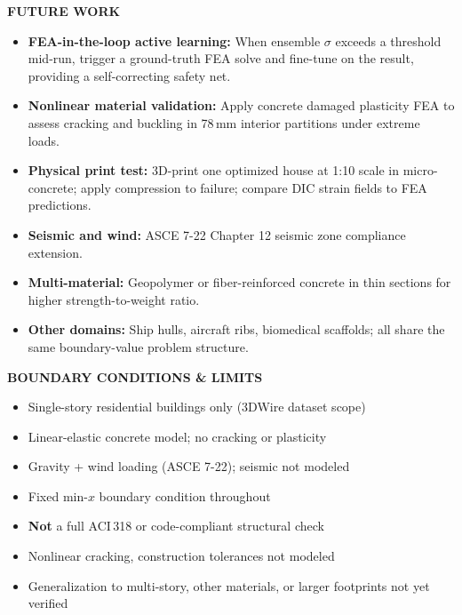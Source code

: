 \documentclass[10pt]{article}
\newenvironment{ccard}{%
  \begin{tcolorbox}[
    colback=cardfill, colframe=cardbdr,
    boxrule=0.5pt, arc=4pt, outer arc=4pt,
    left=3.5mm, right=3.5mm, top=2.5mm, bottom=2.5mm,
    width=\linewidth
  ]%
}{%
  \end{tcolorbox}%
}
\newcommand{\sechdr}[1]{%
  \begin{tcolorbox}[
    colback=secbar, colframe=secbar,
    boxrule=0pt, arc=3pt,
    left=4mm, right=4mm, top=1.5mm, bottom=1.5mm,
    width=\linewidth
  ]
    \centering\color{white}\fontsize{24pt}{26pt}\selectfont\bfseries
    \MakeUppercase{#1}
  \end{tcolorbox}%
  \vspace{1.5mm}%
}
\newlength{\RC}  \setlength{\RC} {29.72cm}
\newlength{\SG}  \setlength{\SG} {1.5mm}
\begin{document}
\begin{minipage}[t]{\RC}
\sechdr{Future Work}
\begin{ccard}
  \small\RaggedRight
  \begin{itemize}[leftmargin=1.2em, itemsep=3pt, topsep=0pt]
    \item \textbf{FEA-in-the-loop active learning:} When ensemble $\sigma$
      exceeds a threshold mid-run, trigger a ground-truth FEA solve and
      fine-tune on the result, providing a self-correcting safety net.
    \item \textbf{Nonlinear material validation:} Apply concrete damaged
      plasticity FEA to assess cracking and buckling in 78\,mm interior
      partitions under extreme loads.
    \item \textbf{Physical print test:} 3D-print one optimized house at
      1:10 scale in micro-concrete; apply compression to failure; compare
      DIC strain fields to FEA predictions.
    \item \textbf{Seismic and wind:} ASCE 7-22 Chapter 12 seismic zone
      compliance extension.
    \item \textbf{Multi-material:} Geopolymer or fiber-reinforced concrete
      in thin sections for higher strength-to-weight ratio.
    \item \textbf{Other domains:} Ship hulls, aircraft ribs, biomedical
      scaffolds; all share the same boundary-value problem structure.
  \end{itemize}
\end{ccard}
\vspace{\SG}

\sechdr{Boundary Conditions \& Limits}
\begin{ccard}
  \small\RaggedRight
  \begin{itemize}[leftmargin=1.2em, itemsep=3pt, topsep=0pt]
    \item Single-story residential buildings only (3DWire dataset scope)
    \item Linear-elastic concrete model; no cracking or plasticity
    \item Gravity + wind loading (ASCE 7-22); seismic not modeled
    \item Fixed min-$x$ boundary condition throughout
    \item \textbf{Not} a full ACI\,318 or code-compliant structural check
    \item Nonlinear cracking, construction tolerances not modeled
    \item Generalization to multi-story, other materials, or larger
      footprints not yet verified
  \end{itemize}
\end{ccard}
\vspace{\SG}


\end{minipage}
\end{document}
